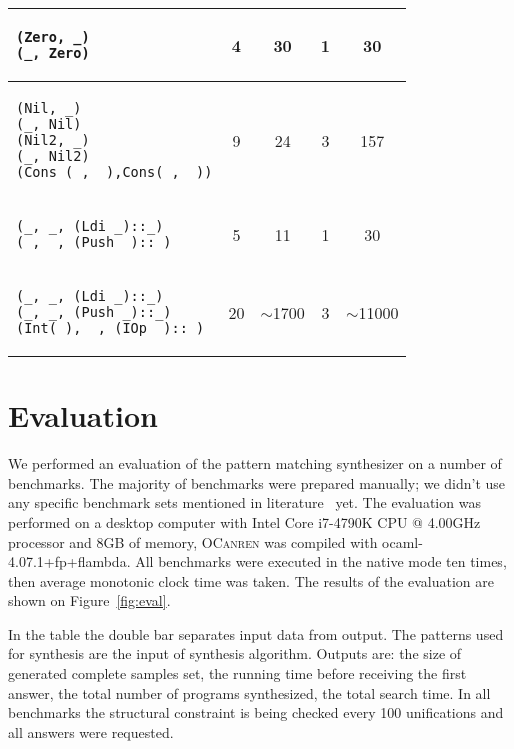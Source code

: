 \begin{table}[t]
\begin{tabular}{|m{3.5cm}||cccc|}
\begin{lstlisting}[basicstyle=\scriptsize]
(Zero, _)
(_, Zero)
    \end{lstlisting} &4&30&1&30
    \\
        \hline
     \begin{lstlisting}[basicstyle=\scriptsize]
(Nil, _)
(_, Nil)
(Nil2, _)
(_, Nil2)
(Cons (_, _),Cons(_, _))
    \end{lstlisting}
     &9&24&3&157                    \\ 
      \hline
     \begin{lstlisting}[basicstyle=\scriptsize]
(_, _, (Ldi _)::_)
(_, _, (Push _)::_)
    \end{lstlisting} &5&11&1&30\\
        \hline      
        \begin{lstlisting}[basicstyle=\scriptsize]
(_, _, (Ldi _)::_)
(_, _, (Push _)::_)
(Int(_), _, (IOp _)::_)
\end{lstlisting}
     &20&$\sim$1700&3&$\sim$11000                    \\ \hline
  \end{tabular}

\end{table}

\FloatBarrier

\section{Evaluation}
\label{sec:eval}


We performed an evaluation of the pattern matching synthesizer on a number of benchmarks.
The majority of benchmarks were prepared manually; we didn't use any specific benchmark sets mentioned in literature~\cite{Scott2000WhenDM} yet.
The evaluation was performed on a desktop computer with Intel Core i7-4790K CPU @ 4.00GHz processor and 8GB of memory,
\textsc{OCanren} was compiled with \mbox{ocaml-4.07.1+fp+flambda}. All benchmarks were executed in the native mode ten times,
then average monotonic clock time was taken. The results of the evaluation are shown on Figure~\ref{fig:eval}.

In the table the double bar separates input data from output. %
The patterns used for synthesis are the input of synthesis algorithm.
Outputs are: the size of generated complete samples set, the running time before receiving the
first answer, the total number of programs synthesized, the total search time.
In all benchmarks the structural constraint is being checked every 100 unifications and all answers were requested.

